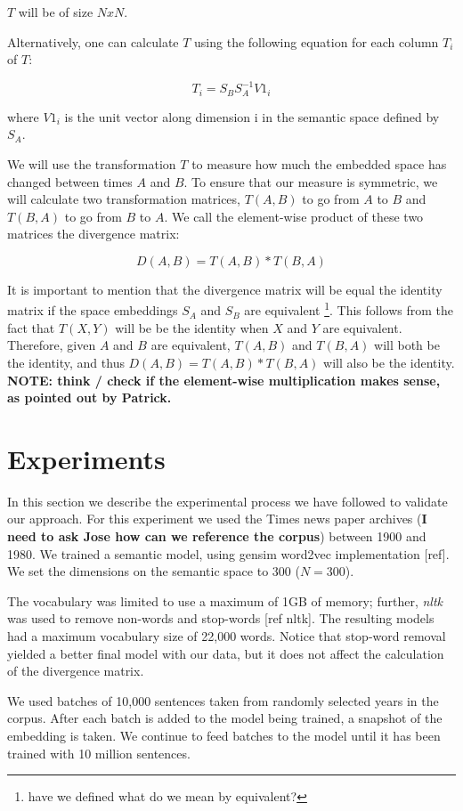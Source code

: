 \documentclass{article} %
\begin{document}
$T$ will be of size $NxN$.

Alternatively, one can calculate $T$ using the following equation for each column $T_i$ of $T$:

$$T_i = S_B S_A^{-1} V1_i $$

where $V1_i$ is the unit vector along dimension i in the semantic space defined by $S_A$.

We will use the transformation $T$ to measure how much the embedded space has changed between times $A$ and $B$. To ensure that our measure is symmetric, we will calculate two transformation matrices, $T(A,B)$ to go from $A$ to $B$ and $T(B,A)$ to go from $B$ to $A$. We call the element-wise product of these two matrices the divergence matrix:

$$D(A,B) = T(A,B) * T(B,A)$$

It is important to mention that the divergence matrix will be equal the identity matrix if the space embeddings $S_A$ and $S_B$ are equivalent \footnote{have we defined what do we mean by equivalent?}. This follows from the fact that $T(X,Y)$ will be be the identity when $X$ and $Y$ are equivalent. Therefore, given $A$ and $B$ are equivalent, $T(A,B)$ and $T(B,A)$ will both be the identity, and thus $D(A,B) = T(A,B) * T(B,A)$ will also be the identity. \textbf{NOTE: think / check if the element-wise multiplication makes sense, as pointed out by Patrick.}

\section{Experiments}
\label{sec:experiments}
In this section we describe the experimental process we have followed to validate our approach. For this experiment we used the Times news paper archives (\textbf{I need to ask Jose how can we reference the corpus}) between 1900 and 1980. We trained a semantic model, using gensim word2vec implementation [ref]. We set the dimensions on the semantic space to 300 ($N = 300$).

The vocabulary was limited to use a maximum of 1GB of memory; further, \textit{nltk} was used to remove non-words and stop-words [ref nltk]. The resulting models had a maximum vocabulary size of 22,000 words. Notice that stop-word removal yielded a better final model with our data, but it does not affect the calculation of the divergence matrix.

We used batches of 10,000 sentences taken from randomly selected years in the corpus. After each batch is added to the model being trained, a snapshot of the embedding is taken. We continue to feed batches to the model until it has been trained with 10 million sentences.
\end{document}
